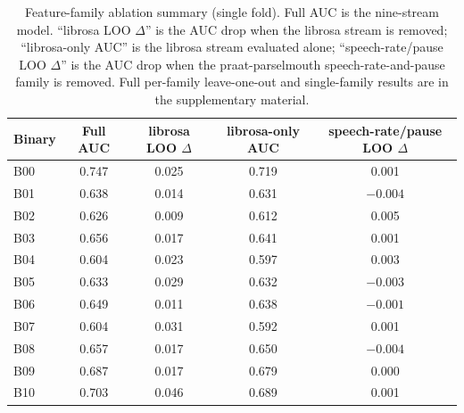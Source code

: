 \documentclass[utf8]{FrontiersinHarvard} %
\begin{document}
\begin{table}[t]
\centering
\caption{Feature-family ablation summary (single fold). Full AUC is the nine-stream model. ``librosa LOO $\Delta$'' is the AUC drop when the librosa stream is removed; ``librosa-only AUC'' is the librosa stream evaluated alone; ``speech-rate/pause LOO $\Delta$'' is the AUC drop when the praat-parselmouth speech-rate-and-pause family is removed. Full per-family leave-one-out and single-family results are in the supplementary material.}
\label{tab:ablation_summary}
\footnotesize
\setlength{\tabcolsep}{6pt}
\renewcommand{\arraystretch}{1.15}
\begin{tabular}{@{}l c c c c@{}}
\toprule
\textbf{Binary} & \textbf{Full AUC} & \textbf{librosa LOO $\Delta$} & \textbf{librosa-only AUC} & \textbf{speech-rate/pause LOO $\Delta$} \\
\midrule
B00 & 0.747 & 0.025 & 0.719 & 0.001 \\
B01 & 0.638 & 0.014 & 0.631 & $-0.004$ \\
B02 & 0.626 & 0.009 & 0.612 & 0.005 \\
B03 & 0.656 & 0.017 & 0.641 & 0.001 \\
B04 & 0.604 & 0.023 & 0.597 & 0.003 \\
B05 & 0.633 & 0.029 & 0.632 & $-0.003$ \\
B06 & 0.649 & 0.011 & 0.638 & $-0.001$ \\
B07 & 0.604 & 0.031 & 0.592 & 0.001 \\
B08 & 0.657 & 0.017 & 0.650 & $-0.004$ \\
B09 & 0.687 & 0.017 & 0.679 & 0.000 \\
B10 & 0.703 & 0.046 & 0.689 & 0.001 \\
\bottomrule
\end{tabular}
\end{table}
\end{document}
